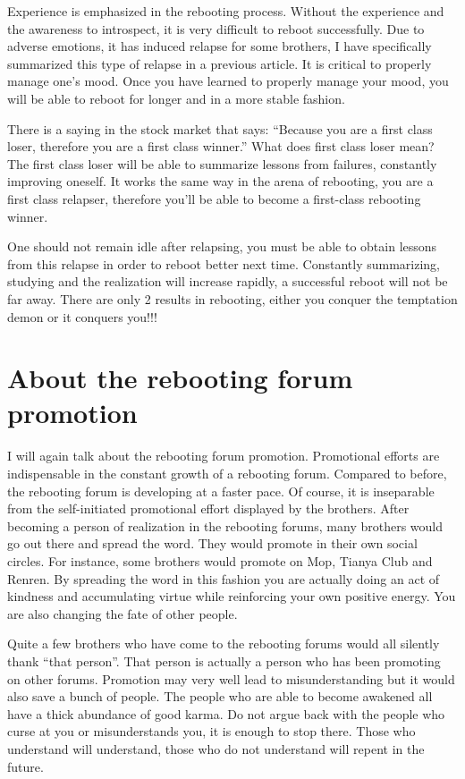 \documentclass[
]{book}
\begin{document}
Experience is emphasized in the rebooting process. Without the experience and the awareness to introspect, it is very difficult to reboot successfully. Due to adverse emotions, it has induced relapse for some brothers, I have specifically summarized this type of relapse in a previous article. It is critical to properly manage one's mood. Once you have learned to properly manage your mood, you will be able to reboot for longer and in a more stable fashion.

There is a saying in the stock market that says: ``Because you are a first class loser, therefore you are a first class winner.'' What does first class loser mean? The first class loser will be able to summarize lessons from failures, constantly improving oneself. It works the same way in the arena of rebooting, you are a first class relapser, therefore you'll be able to become a first-class rebooting winner.

One should not remain idle after relapsing, you must be able to obtain lessons from this relapse in order to reboot better next time. Constantly summarizing, studying and the realization will increase rapidly, a successful reboot will not be far away. There are only 2 results in rebooting, either you conquer the temptation demon or it conquers you!!!

\hypertarget{about-the-rebooting-forum-promotion}{%
\section{About the rebooting forum promotion}\label{about-the-rebooting-forum-promotion}}

I will again talk about the rebooting forum promotion. Promotional efforts are indispensable in the constant growth of a rebooting forum. Compared to before, the rebooting forum is developing at a faster pace. Of course, it is inseparable from the self-initiated promotional effort displayed by the brothers. After becoming a person of realization in the rebooting forums, many brothers would go out there and spread the word. They would promote in their own social circles. For instance, some brothers would promote on Mop, Tianya Club and Renren. By spreading the word in this fashion you are actually doing an act of kindness and accumulating virtue while reinforcing your own positive energy. You are also changing the fate of other people.

Quite a few brothers who have come to the rebooting forums would all silently thank ``that person''. That person is actually a person who has been promoting on other forums. Promotion may very well lead to misunderstanding but it would also save a bunch of people. The people who are able to become awakened all have a thick abundance of good karma. Do not argue back with the people who curse at you or misunderstands you, it is enough to stop there. Those who understand will understand, those who do not understand will repent in the future.
\end{document}

